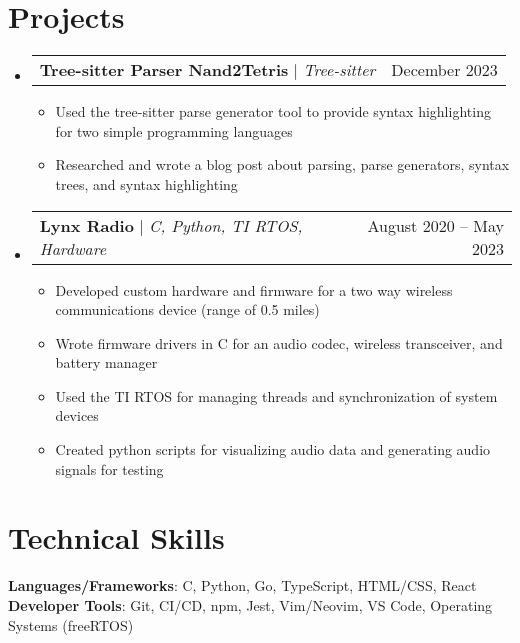 \documentclass[letterpaper,11pt]{article}
\makeatletter
\newcommand{\resumeItem}[1]{
  \item\small{
    {#1 \vspace{-2pt}}
  }
}
\newcommand{\resumeProjectHeading}[2]{
    \item
    \begin{tabular*}{0.97\textwidth}{l@{\extracolsep{\fill}}r}
      \small#1 & #2 \\
    \end{tabular*}\vspace{-7pt}
}
\newcommand{\resumeSubHeadingListStart}{\begin{itemize}[leftmargin=0.15in, label={}]}
\newcommand{\resumeSubHeadingListEnd}{\end{itemize}}
\newcommand{\resumeItemListStart}{\begin{itemize}}
\newcommand{\resumeItemListEnd}{\end{itemize}\vspace{-5pt}}
\makeatother
\begin{document}
\section{Projects}
    \resumeSubHeadingListStart
      \resumeProjectHeading
          {\textbf{Tree-sitter Parser Nand2Tetris} $|$ \emph{Tree-sitter}}{December 2023}
          \resumeItemListStart
            \resumeItem{Used the tree-sitter parse generator tool to provide syntax highlighting for two simple programming languages}
            \resumeItem{Researched and wrote a blog post about parsing, parse generators, syntax trees, and syntax highlighting}
          \resumeItemListEnd
      \resumeProjectHeading
          {\textbf{Lynx Radio} $|$ \emph{C, Python, TI RTOS, Hardware}}{August 2020 -- May 2023}
          \resumeItemListStart
            \resumeItem{Developed custom hardware and firmware for a two way wireless communications device (range of 0.5 miles)}
            \resumeItem{Wrote firmware drivers in C for an audio codec, wireless transceiver, and battery manager}
            \resumeItem{Used the TI RTOS for managing threads and synchronization of system devices}
            \resumeItem{Created python scripts for visualizing audio data and generating audio signals for testing}
          \resumeItemListEnd
    \resumeSubHeadingListEnd

\section{Technical Skills}
 \begin{itemize}[leftmargin=0.15in, label={}]
    \small{\item{
     \textbf{Languages/Frameworks}{: C, Python, Go, TypeScript, HTML/CSS, React} \\
     \textbf{Developer Tools}{: Git, CI/CD, npm, Jest, Vim/Neovim, VS Code, Operating Systems (freeRTOS)} \\
    }}
 \end{itemize}


\end{document}

